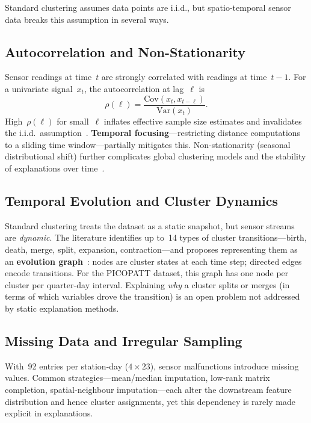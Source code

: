 \documentclass{article}
\theoremstyle{plain}
\theoremstyle{definition}
\theoremstyle{remark}
\begin{document}
Standard clustering assumes data points are i.i.d., but spatio-temporal
sensor data breaks this assumption in several ways.

\subsection{Autocorrelation and Non-Stationarity}

Sensor readings at time~$t$ are strongly correlated with readings at
time~$t{-}1$. For a univariate signal~$x_t$, the autocorrelation at
lag~$\ell$ is
\[
  \rho(\ell) = \frac{\mathrm{Cov}(x_t, x_{t-\ell})}{\mathrm{Var}(x_t)}.
\]
High~$\rho(\ell)$ for small~$\ell$ inflates effective sample size
estimates and invalidates the i.i.d.\ assumption~\cite{hamdi_spatiotemporal_2022}.
\textbf{Temporal focusing}---restricting distance computations to a
sliding time window---partially mitigates this. Non-stationarity (seasonal
distributional shift) further complicates global clustering models and
the stability of explanations over time~\cite{schlegel_towards_2025}.

\subsection{Temporal Evolution and Cluster Dynamics}

Standard clustering treats the dataset as a static snapshot, but sensor
streams are \emph{dynamic}. The literature identifies up to~14 types of
cluster transitions---birth, death, merge, split, expansion,
contraction---and proposes representing them as an \textbf{evolution
graph}~\cite{hamdi_spatiotemporal_2022}: nodes are cluster states at each time step;
directed edges encode transitions. For the PICOPATT dataset, this graph
has one node per cluster per quarter-day interval. Explaining \emph{why}
a cluster splits or merges (in terms of which variables drove the
transition) is an open problem not addressed by static explanation
methods.

\subsection{Missing Data and Irregular Sampling}

With~92 entries per station-day ($4 \times 23$), sensor malfunctions
introduce missing values. Common strategies---mean/median imputation,
low-rank matrix completion, spatial-neighbour imputation---each alter the
downstream feature distribution and hence cluster assignments, yet this
dependency is rarely made explicit in explanations.
\end{document}
